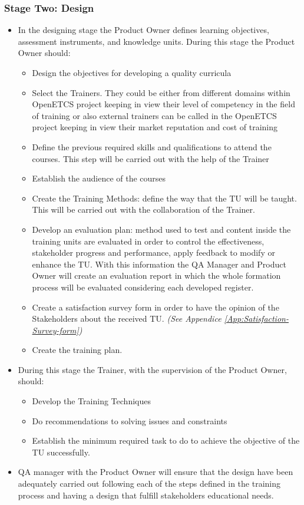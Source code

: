 \documentclass{template/openetcs_article}
\begin{document}
\subsubsection{Stage Two: Design}

\begin{itemize}
\item In the designing stage the Product Owner defines learning objectives, assessment instruments, and knowledge units. During this stage the Product Owner should: 
\begin{itemize}
\item Design the objectives for developing a quality curricula
\item Select the Trainers. They could be either from different domains within OpenETCS project keeping in view their level of competency in the field of training or also external trainers can be called in the OpenETCS project keeping in view their market reputation and cost of training
\item Define the previous required skills and qualifications to attend the courses. This step will be carried out with the help of the Trainer
\item Establish the audience of the courses
\item Create the Training Methods: define the way that the TU will be taught. This will be carried out with the collaboration of the Trainer.
\item Develop an evaluation plan: method used to test and content inside the training units are evaluated in order to control the effectiveness, stakeholder progress and performance, apply feedback to modify or enhance the TU. With this information the QA Manager and Product Owner will create an evaluation report in which the whole formation process will be evaluated considering each developed register.
\item Create a satisfaction survey form in order to have the opinion of the Stakeholders about the received TU. {\it {(See Appendice \ref{App:Satisfaction-Survey-form})}}
\item Create the training plan.
\end{itemize}
\item During this stage the Trainer, with the supervision of the Product Owner, should:
\begin{itemize}
\item Develop the Training Techniques
\item Do recommendations to solving issues and constraints
\item Establish the minimum required task to do to achieve the objective of the TU successfully.
\end{itemize}
\item QA manager with the Product Owner will ensure that the design have been adequately carried out following each of the steps defined in the training process and having a design that fulfill stakeholders educational needs.
\end{itemize}
\end{document}
